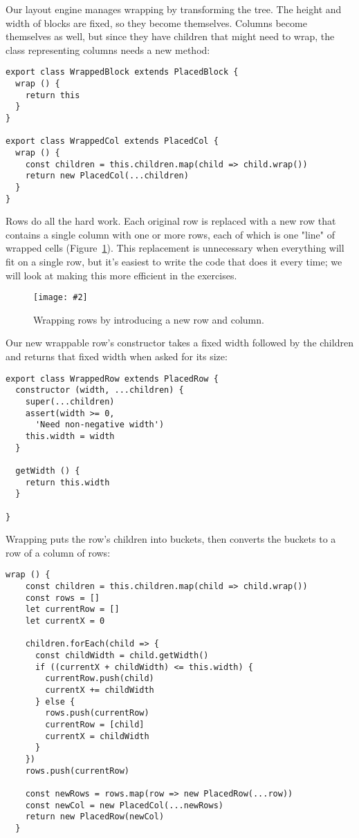\documentclass[krantzl]{krantz}
\newcommand{\figpdf}[4]{\begin{figure}%
\centering%
\texttt{[image: \#2]}%
\caption{#3}%
\label{#1}%
\end{figure}}
\newcommand{\figref}[1]{Figure~\ref{#1}}
\begin{document}
Our layout engine manages wrapping by transforming the tree.
The height and width of blocks are fixed,
so they become themselves.
Columns become themselves as well,
but since they have children that might need to wrap,
the class representing columns needs a new method:


\begin{lstlisting}[frame=single,frameround=tttt]
export class WrappedBlock extends PlacedBlock {
  wrap () {
    return this
  }
}

export class WrappedCol extends PlacedCol {
  wrap () {
    const children = this.children.map(child => child.wrap())
    return new PlacedCol(...children)
  }
}
\end{lstlisting}



Rows do all the hard work.
Each original row is replaced with a new row that contains a single column with one or more rows,
each of which is one "line" of wrapped cells
(\figref{layout-engine-wrap}).
This replacement is unnecessary when everything will fit on a single row,
but it's easiest to write the code that does it every time;
we will look at making this more efficient in the exercises.

\figpdf{layout-engine-wrap}{./layout-engine/wrap.pdf}{Wrapping rows by introducing a new row and column.}{0.6}


Our new wrappable row's constructor takes a fixed width followed by the children
and returns that fixed width when asked for its size:


\begin{lstlisting}[frame=single,frameround=tttt]
export class WrappedRow extends PlacedRow {
  constructor (width, ...children) {
    super(...children)
    assert(width >= 0,
      'Need non-negative width')
    this.width = width
  }

  getWidth () {
    return this.width
  }

}
\end{lstlisting}



\noindent Wrapping puts the row's children into buckets,
then converts the buckets to a row of a column of rows:


\begin{lstlisting}[frame=single,frameround=tttt]
  wrap () {
    const children = this.children.map(child => child.wrap())
    const rows = []
    let currentRow = []
    let currentX = 0

    children.forEach(child => {
      const childWidth = child.getWidth()
      if ((currentX + childWidth) <= this.width) {
        currentRow.push(child)
        currentX += childWidth
      } else {
        rows.push(currentRow)
        currentRow = [child]
        currentX = childWidth
      }
    })
    rows.push(currentRow)

    const newRows = rows.map(row => new PlacedRow(...row))
    const newCol = new PlacedCol(...newRows)
    return new PlacedRow(newCol)
  }
\end{lstlisting}
\end{document}
